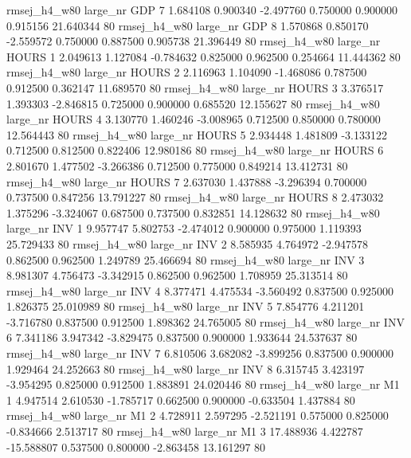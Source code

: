 rmsej_h4_w80   large_nr      GDP                 7  1.684108  0.900340  -2.497760 0.750000 0.900000  0.915156   21.640344 80
rmsej_h4_w80   large_nr      GDP                 8  1.570868  0.850170  -2.559572 0.750000 0.887500  0.905738   21.396449 80
rmsej_h4_w80   large_nr    HOURS                 1  2.049613  1.127084  -0.784632 0.825000 0.962500  0.254664   11.444362 80
rmsej_h4_w80   large_nr    HOURS                 2  2.116963  1.104090  -1.468086 0.787500 0.912500  0.362147   11.689570 80
rmsej_h4_w80   large_nr    HOURS                 3  3.376517  1.393303  -2.846815 0.725000 0.900000  0.685520   12.155627 80
rmsej_h4_w80   large_nr    HOURS                 4  3.130770  1.460246  -3.008965 0.712500 0.850000  0.780000   12.564443 80
rmsej_h4_w80   large_nr    HOURS                 5  2.934448  1.481809  -3.133122 0.712500 0.812500  0.822406   12.980186 80
rmsej_h4_w80   large_nr    HOURS                 6  2.801670  1.477502  -3.266386 0.712500 0.775000  0.849214   13.412731 80
rmsej_h4_w80   large_nr    HOURS                 7  2.637030  1.437888  -3.296394 0.700000 0.737500  0.847256   13.791227 80
rmsej_h4_w80   large_nr    HOURS                 8  2.473032  1.375296  -3.324067 0.687500 0.737500  0.832851   14.128632 80
rmsej_h4_w80   large_nr      INV                 1  9.957747  5.802753  -2.474012 0.900000 0.975000  1.119393   25.729433 80
rmsej_h4_w80   large_nr      INV                 2  8.585935  4.764972  -2.947578 0.862500 0.962500  1.249789   25.466694 80
rmsej_h4_w80   large_nr      INV                 3  8.981307  4.756473  -3.342915 0.862500 0.962500  1.708959   25.313514 80
rmsej_h4_w80   large_nr      INV                 4  8.377471  4.475534  -3.560492 0.837500 0.925000  1.826375   25.010989 80
rmsej_h4_w80   large_nr      INV                 5  7.854776  4.211201  -3.716780 0.837500 0.912500  1.898362   24.765005 80
rmsej_h4_w80   large_nr      INV                 6  7.341186  3.947342  -3.829475 0.837500 0.900000  1.933644   24.537637 80
rmsej_h4_w80   large_nr      INV                 7  6.810506  3.682082  -3.899256 0.837500 0.900000  1.929464   24.252663 80
rmsej_h4_w80   large_nr      INV                 8  6.315745  3.423197  -3.954295 0.825000 0.912500  1.883891   24.020446 80
rmsej_h4_w80   large_nr       M1                 1  4.947514  2.610530  -1.785717 0.662500 0.900000 -0.633504    1.437884 80
rmsej_h4_w80   large_nr       M1                 2  4.728911  2.597295  -2.521191 0.575000 0.825000 -0.834666    2.513717 80
rmsej_h4_w80   large_nr       M1                 3 17.488936  4.422787 -15.588807 0.537500 0.800000 -2.863458   13.161297 80
